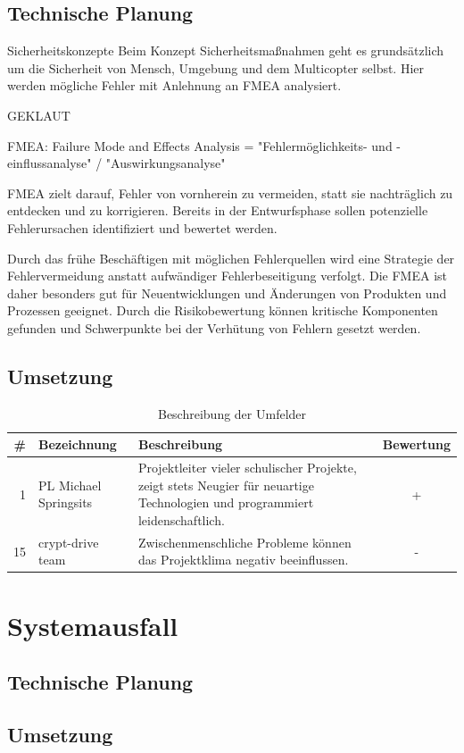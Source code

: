   \subsection{Technische Planung}

Sicherheitskonzepte
Beim Konzept Sicherheitsmaßnahmen geht es grundsätzlich um die Sicherheit von Mensch, Umgebung und dem Multicopter selbst. Hier werden mögliche Fehler mit Anlehnung an FMEA analysiert.

GEKLAUT

FMEA: Failure Mode and Effects Analysis = "Fehlermöglichkeits- und -einflussanalyse" / "Auswirkungsanalyse"

FMEA zielt darauf, Fehler von vornherein zu vermeiden, statt sie nachträglich zu entdecken und zu korrigieren. Bereits in der Entwurfsphase sollen potenzielle Fehlerursachen identifiziert und bewertet werden. 

Durch das frühe Beschäftigen mit möglichen Fehlerquellen wird eine Strategie der Fehlervermeidung anstatt aufwändiger Fehlerbeseitigung verfolgt. Die FMEA ist daher besonders gut für Neuentwicklungen und Änderungen von Produkten und Prozessen geeignet. Durch die Risikobewertung können kritische Komponenten gefunden und Schwerpunkte bei der Verhütung von Fehlern gesetzt werden.

  \subsection{Umsetzung}


\begin{table}[H]
\centering
\begin{tabular}{|r|l|p{7cm}|c|}
\hline \# & Bezeichnung & Beschreibung & Bewertung \\\hline
\hline 1 & PL Michael Springsits & Projektleiter vieler schulischer Projekte, zeigt stets Neugier für neuartige Technologien und programmiert leidenschaftlich. & + \\
\hline 15 & crypt-drive team & Zwischenmenschliche Probleme können das Projektklima negativ beeinflussen.  & - \\\hline
\end{tabular}
\caption{Beschreibung der Umfelder}
\end{table}




\section{Systemausfall}

  \subsection{Technische Planung}

  \subsection{Umsetzung}

